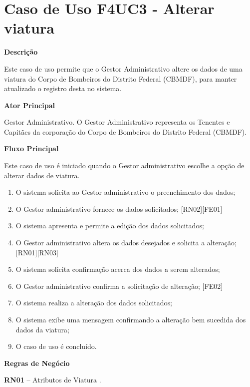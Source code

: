 
  \section{Caso de Uso F4UC3 - Alterar viatura}

  {\raggedright
      \textbf{Descrição}
  }

Este caso de uso permite que o Gestor Administrativo altere os dados de uma  viatura do Corpo de 
Bombeiros do Distrito Federal (CBMDF), para manter atualizado o registro desta no sistema. 
    
  {\raggedright
      \textbf{Ator Principal}
  }

    Gestor Administrativo. O Gestor Administrativo representa os Tenentes e Capitães da corporação do Corpo de Bombeiros do Distrito
    Federal (CBMDF).

  {\raggedright
      \textbf{Fluxo Principal}
  }
  
Este caso de uso é iniciado quando o Gestor administrativo escolhe a opção de alterar dados de viatura.

  \begin{enumerate}

\item O sistema solicita ao Gestor administrativo o preenchimento dos dados; 
\item O Gestor administrativo fornece os dados solicitados; [RN02][FE01]
\item O sistema apresenta e permite a edição dos dados solicitados; 
\item O Gestor administrativo altera os dados desejados e solicita a alteração; [RN01][RN03]
\item O sistema solicita confirmação acerca dos dados a serem alterados; 
\item O Gestor administrativo confirma a solicitação de alteração; [FE02]
\item O sistema realiza a alteração dos dados solicitados;
\item O sistema exibe uma mensagem confirmando a alteração bem sucedida dos dados da viatura; 
\item O caso de uso é concluído.
    
  \end{enumerate}
  
  \vfill
  \pagebreak
  
   {\raggedright
      \textbf{Regras de Negócio}
   }
   
   \textbf{RN01} – Atributos de Viatura	.
   

